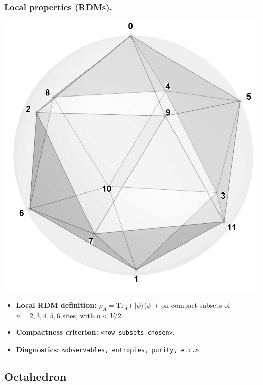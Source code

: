 \documentclass[11pt,a4paper]{article}
\begin{document}
\subsubsection*{Local properties (RDMs).}
\begin{center}
  \includegraphics[width=.6\linewidth]{icosahedron}
\end{center}

\begin{itemize}[leftmargin=1.5em]
  \item \textbf{Local RDM definition:} $\rho_A=\mathrm{Tr}_{\bar A}(|\psi\rangle\langle\psi|)$ on compact subsets of $n=2,3,4,5,6$ sites, with $n < V/2$.
  \item \textbf{Compactness criterion:} \texttt{<how subsets chosen>}.
  \item \textbf{Diagnostics:} \texttt{<observables, entropies, purity, etc.>}.
\end{itemize}


\subsection*{Octahedron}
\end{document}
